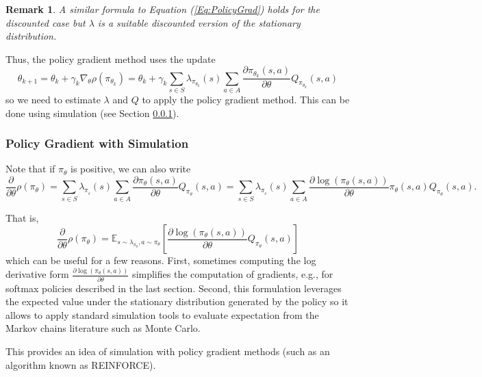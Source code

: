 \documentclass[letter,11pt]{article}
\newtheorem{remark}{Remark}[section]
\begin{document}
\begin{remark}
    A similar formula to Equation (\ref{Eq:PolicyGrad}) holds for the discounted case but $\lambda$ is a suitable discounted version of the stationary distribution.   
\end{remark}

Thus, the policy gradient method uses the update 
\[
\theta_{k+1} = \theta_k + \gamma_k \nabla_\theta \rho(\pi_{\theta_{k} } ) = \theta_{k} + \gamma_k \sum_{s \in S } \lambda _{\pi _{\theta _{k}} } (s) \sum_{a \in A}  \frac{\partial \pi_{\theta_{k}} (s, a)}{\partial \theta} Q_{\pi_{\theta_{k} } }(s, a)
\]
so we need to estimate $\lambda$ and $Q$ to apply the policy gradient method. This can be done using simulation (see Section \ref{Sec:PolicySimulation}). 


\subsubsection{Policy Gradient with Simulation} \label{Sec:PolicySimulation}
Note that if $\pi_{\theta}$ is positive, we can also write 
$$\frac{\partial }{\partial \theta}\rho (\pi_{\theta} )  = \sum_{s \in S } \lambda_{{\pi _{ _{\theta}} } } (s) \sum_{a \in A}  \frac{\partial \pi_\theta(s, a)}{\partial \theta} Q_{\pi_\theta}(s, a) = \sum_{s \in S } \lambda_{{\pi _{ _{\theta}} } } (s) \sum_{a \in A} \frac{\partial \log ( \pi_\theta(s, a))}{\partial \theta}  \pi_\theta(s, a) Q_{\pi_\theta}(s, a). $$

That is,
\[
\frac{\partial }{\partial \theta}\rho (\pi_{\theta} ) = \mathbb{E}_{s \sim \lambda_{\pi_{\theta}}, a \sim \pi_{\theta}} \left[ \frac{\partial \log (\pi_\theta(s, a))}{\partial \theta} Q_{\pi_\theta}(s, a) \right]
\]
which can be useful for a few reasons. First, sometimes computing the log derivative form \( \frac{\partial \log (\pi_\theta(s, a))}{\partial \theta} \) simplifies the computation of gradients, e.g., for softmax policies described in the last section. 
Second, this formulation leverages the expected value under the stationary distribution generated by the policy so it allows to apply standard simulation tools to evaluate expectation from the Markov chains literature such as Monte Carlo. 

This provides an idea of simulation with policy gradient methods (such as an algorithm known as REINFORCE).

\end{document}
